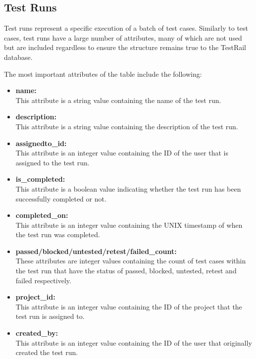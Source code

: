 \subsection{Test Runs}

Test runs represent a specific execution of a batch of test cases. Similarly to test cases, test runs have a large number of attributes, many of which are not used but are included regardless to ensure the structure remains true to the TestRail database.

The most important attributes of the table include the following:~\cite{TRRuns}
\begin{itemize}
    \item \textbf{name:} \\
    This attribute is a string value containing the name of the test run.

    \item \textbf{description:} \\
    This attribute is a string value containing the description of the test run.

    \item \textbf{assignedto_id:} \\
    This attribute is an integer value containing the ID of the user that is assigned to the test run.

    \item \textbf{is_completed:} \\
    This attribute is a boolean value indicating whether the test run has been successfully completed or not.

    \item \textbf{completed_on:} \\
    This attribute is an integer value containing the UNIX timestamp of when the test run was completed.

    \item \textbf{passed/blocked/untested/retest/failed_count:} \\
    These attributes are integer values containing the count of test cases within the test run that have the status of passed, blocked, untested, retest and failed respectively.

    \item \textbf{project_id:} \\
    This attribute is an integer value containing the ID of the project that the test run is assigned to.

    \item \textbf{created_by:} \\
    This attribute is an integer value containing the ID of the user that originally created the test run.


\end{itemize}

